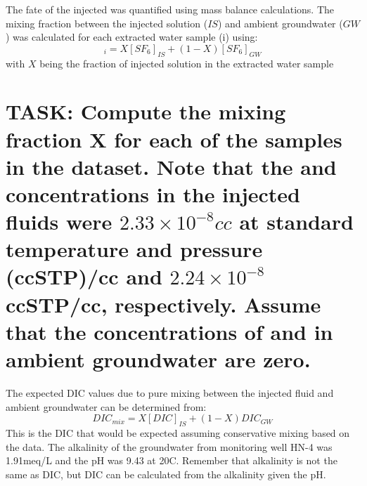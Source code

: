\documentclass[nofonts,x11names]{tufte-handout}
\begin{document}
The fate of the injected  was quantified using mass balance
calculations. The mixing fraction between the injected solution (\(IS\))
and ambient groundwater (\(GW\)) was calculated for each extracted water
sample (i) using: \begin{equation}
[SF_6]_i=X[SF_6]_{IS}+(1-X)[SF_6]_{GW}
\end{equation}
with \(X\) being the fraction of injected solution in the extracted
water sample

\section{\texorpdfstring{TASK: Compute the mixing fraction X for each of
the samples in the \citet{Matter:2016aa} dataset. Note that the 
and  concentrations in the injected fluids were
\(2.33 \times 10^{-8} cc\) at standard temperature and pressure
(ccSTP)/cc and \(2.24 \times 10^{-8}\) ccSTP/cc, respectively. Assume
that the concentrations of  and  in ambient
groundwater are
zero.}{TASK: Compute the mixing fraction X for each of the samples in the @Matter:2016aa dataset. Note that the  and  concentrations in the injected fluids were 2.33 \textbackslash times 10\^{}\{-8\} cc at standard temperature and pressure (ccSTP)/cc and 2.24 \textbackslash times 10\^{}\{-8\} ccSTP/cc, respectively. Assume that the concentrations of  and  in ambient groundwater are zero.}}\label{task-compute-the-mixing-fraction-x-for-each-of-the-samples-in-the-matter2016aa-dataset.-note-that-the-and-concentrations-in-the-injected-fluids-were-2.33-times-10-8-cc-at-standard-temperature-and-pressure-ccstpcc-and-2.24-times-10-8-ccstpcc-respectively.-assume-that-the-concentrations-of-and-in-ambient-groundwater-are-zero.}

\noindent The expected DIC values due to pure mixing between the
injected fluid and ambient groundwater can be determined from:
\begin{equation}
DIC_{mix}=X[DIC]_{IS}+(1-X)DIC_{GW}
\end{equation} This is the DIC that would be expected assuming
conservative mixing based on the  data. The alkalinity of the
groundwater from monitoring well HN-4 was 1.91meq/L and the pH was 9.43
at 20C. Remember that alkalinity is not the same as DIC, but DIC can be
calculated from the alkalinity given the pH.
\end{document}
